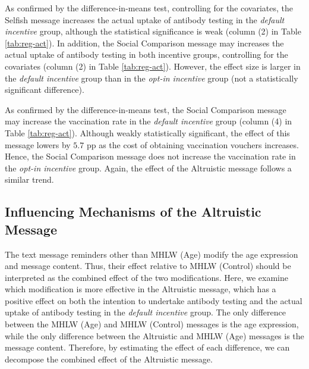 \documentclass[
]{article}
\begin{document}
As confirmed by the difference-in-means test, controlling for the covariates, the Selfish message increases the actual uptake of antibody testing in the \emph{default incentive} group, although the statistical significance is weak (column (2) in Table \ref{tab:reg-act}). In addition, the Social Comparison message may increases the actual uptake of antibody testing in both incentive groups, controlling for the covariates (column (2) in Table \ref{tab:reg-act}). However, the effect size is larger in the \emph{default incentive} group than in the \emph{opt-in incentive} group (not a statistically significant difference).

As confirmed by the difference-in-means test, the Social Comparison message may increase the vaccination rate in the \emph{default incentive} group (column (4) in Table \ref{tab:reg-act}). Although weakly statistically significant, the effect of this message lowers by \(5.7\) pp as the cost of obtaining vaccination vouchers increases. Hence, the Social Comparison message does not increase the vaccination rate in the \emph{opt-in incentive} group. Again, the effect of the Altruistic message follows a similar trend.

\hypertarget{influencing-mechanisms-of-the-altruistic-message}{%
\subsection{Influencing Mechanisms of the Altruistic Message}\label{influencing-mechanisms-of-the-altruistic-message}}

The text message reminders other than MHLW (Age) modify the age expression and message content. Thus, their effect relative to MHLW (Control) should be interpreted as the combined effect of the two modifications. Here, we examine which modification is more effective in the Altruistic message, which has a positive effect on both the intention to undertake antibody testing and the actual uptake of antibody testing in the \emph{default incentive} group. The only difference between the MHLW (Age) and MHLW (Control) messages is the age expression, while the only difference between the Altruistic and MHLW (Age) messages is the message content. Therefore, by estimating the effect of each difference, we can decompose the combined effect of the Altruistic message.
\end{document}
